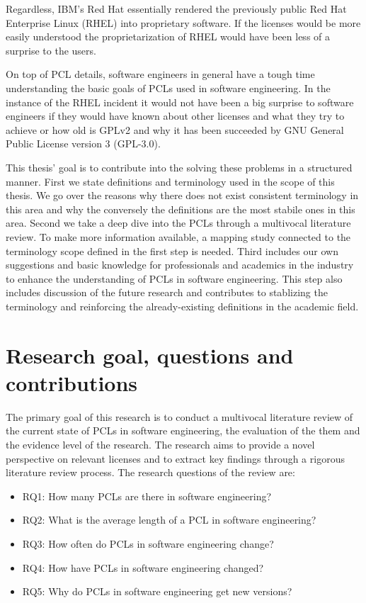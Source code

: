 Regardless, IBM's Red Hat essentially rendered the previously public Red Hat Enterprise Linux (RHEL) into proprietary software. If the licenses would be more easily understood the proprietarization of RHEL would have been less of a surprise to the users.

On top of PCL details, software engineers in general have a tough time understanding the basic goals of PCLs used in software engineering. In the instance of the RHEL incident it would not have been a big surprise to software engineers if they would have known about other licenses and what they try to achieve or how old is GPLv2 and why it has been succeeded by GNU General Public License version 3 (GPL-3.0).

This thesis' goal is to contribute into the solving these problems in a structured manner. First we state definitions and terminology used in the scope of this thesis. We go over the reasons why there does not exist consistent terminology in this area and why the conversely the definitions are the most stabile ones in this area. Second we take a deep dive into the PCLs through a multivocal literature review. To make more information available, a mapping study connected to the terminology scope defined in the first step is needed. Third includes our own suggestions and basic knowledge for professionals and academics in the industry to enhance the understanding of PCLs in software engineering. This step also includes discussion of the future research and contributes to stablizing the terminology and reinforcing the already-existing definitions in the academic field.

\section{Research goal, questions and contributions}
The primary goal of this research is to conduct a multivocal literature review of the current state of PCLs in software engineering, the evaluation of the them and the evidence level of the research. The research aims to provide a novel perspective on relevant licenses and to extract key findings through a rigorous literature review process. The research questions of the review are:
\begin{itemize}
	\item RQ1: How many PCLs are there in software engineering?
	\item RQ2: What is the average length of a PCL in software engineering?
	\item RQ3: How often do PCLs in software engineering change?
	\item RQ4: How have PCLs in software engineering changed?
	\item RQ5: Why do PCLs in software engineering get new versions?
\end{itemize}


